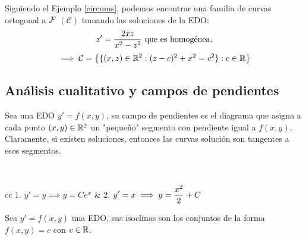 \begin{ejem}
    Siguiendo el Ejemplo \cref{circums}, podemos encontrar una familia de curvas ortogonal a $\mathcal{F}$ $(\mathcal{C})$ tomando las soluciones de la EDO:
    \[\displaystyle z'=\frac{2xz}{x^2-z^2} \text{ que es homogénea.}\]
    \[\implies \mathcal{C} =\left\{\{(x,z)\in \mathbb{R}^2 : (z-c)^2+x^2=c^2\} : c\in\mathbb{R}\right\}\]
    \begin{figure}[htbp]
        \centering
        \vspace{-0.7cm} %
        
        \vspace{-0.2cm} %
    \end{figure}
\end{ejem}

\subsection{Análisis cualitativo y campos de pendientes}
\begin{defn}
    Sea una EDO $y'=f(x,y)$, su campo de pendientes es el diagrama que asigna a cada punto $(x,y)\in \mathbb{R}^2$ un "pequeño" segmento con pendiente igual a $f(x,y)$. Claramente, si existen soluciones, entonces las curvas solución son tangentes a esos segmentos.
\end{defn}

\begin{ejem}\mbox{}\\
    \hspace{-1cm}
    \begin{tabular}{cc}
        1. $y'=y \implies y=Ce^x$ & 2. $\displaystyle y'=x \implies y=\frac{x^2}{2}+C$ \\
        \ifdraft{\framebox(7cm,7cm){} & \framebox(7cm,7cm){}}{&}
    \end{tabular}
\end{ejem}

\begin{defn}[Isoclina]
    Sea $y'=f(x,y)$ una EDO, sus isoclinas son los conjuntos de la forma $f(x, y)=c$ con $c\in \mathbb{R}$.
\end{defn}

